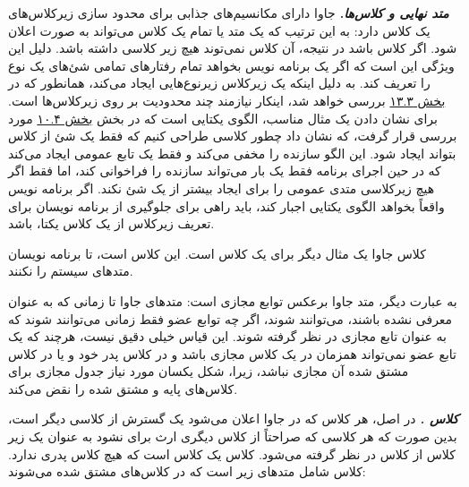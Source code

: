 \documentclass[a4paper,12pt]{report}
\newcommand{\lrm}[1]{{\color{steelBlue}\lr{\texttt{#1}}}}
\begin{document}
	
	\textit{\textbf{
			متد نهایی
			 و کلاس‌ها.}}   جاوا دارای مکانسیم‌های جذابی برای محدود سازی زیرکلاس‌های یک کلاس دارد: به این ترتیب که یک متد یا تمام یک کلاس می‌تواند به صورت 
	  اعلان شود. اگر کلاس 
	   باشد در نتیجه، آن کلاس نمی‌توند هیچ زیر کلاسی داشته باشد. دلیل این ویژگی این است که اگر یک برنامه نویس بخواهد تمام رفتارهای تمامی شئ‌های یک نوع را تعریف کند. به دلیل اینکه یک زیرکلاس زیرنوع‌هایی ایجاد می‌کند، همانطور که در 
	\hyperref[sec3:chap13]{
	بخش ۱۳.۳} بررسی خواهد شد، اینکار نیازمند چند محدودیت بر روی زیرکلاس‌ها است. برای نشان دادن یک مثال مناسب، الگوی یکتایی
	است که در بخش 
	\hyperref[sec4:chap10]{
	بخش ۱۰.۴} مورد بررسی قرار گرفت، که نشان داد چطور کلاسی طراحی کنیم که فقط یک شئ
	از کلاس بتواند ایجاد شود. این الگو سازنده را مخفی می‌کند و فقط یک تابع عمومی ایجاد می‌کند که در حین اجرای برنامه فقط یک بار می‌تواند سازنده را فراخوانی کند، اما فقط اگر هیچ زیرکلاسی متدی عمومی را برای ایجاد بیشتر از یک شئ 
	 نکند.
	اگر برنامه نویس واقعاً بخواهد الگوی یکتایی اجبار کند، باید راهی برای جلوگیری از برنامه نویسان برای تعریف زیرکلاس از یک کلاس یکتا، باشد. 
	
	 کلاس جاوا 
	\lrm{java.lang.System}
	یک مثال دیگر برای یک کلاس
	 است. این کلاس 
	 است، تا برنامه نویسان متد‌های سیستم را 
	نکنند.
	
	به عبارت دیگر،‌ متد 
	جاوا برعکس توابع مجازی 
	است: متد‌های جاوا تا زمانی که به عنوان 
	معرفی نشده باشند، می‌توانند 
	 شوند، اگر چه توابع عضو 
	 فقط زمانی می‌توانند 
	  شوند که به عنوان تابع مجازی در نظر گرفته شوند.
	 این قیاس خیلی دقیق نیست، هرچند که یک تابع عضو 
	 نمی‌تواند همزمان در یک کلاس مجازی باشد و در کلاس پدر خود و یا در کلاس مشتق شده آن مجازی نباشد، زیرا،   شکل یکسان مورد نیاز جدول مجازی برای کلاس‌های پایه و مشتق شده را نقض می‌کند. 
	
	
	\textit{\textbf{
	کلاس 
	.}} در اصل، هر کلاس که در جاوا اعلان می‌شود یک گسترش
 از کلاسی دیگر است، بدین صورت که هر کلاسی که صراحتاً از کلاس دیگری ارث برای نشود به عنوان یک زیر کلاس از کلاس 
 در نظر گرفته می‌شود.
	کلاس 
	\lrm{Object}
	یک کلاس است که هیچ کلاس پدری ندارد. کلاس 
	\lrm{Object}
	شامل متدهای زیر است که در کلاس‌های مشتق شده 
	\lrm{override}
	می‌شوند:
	
\end{document}
